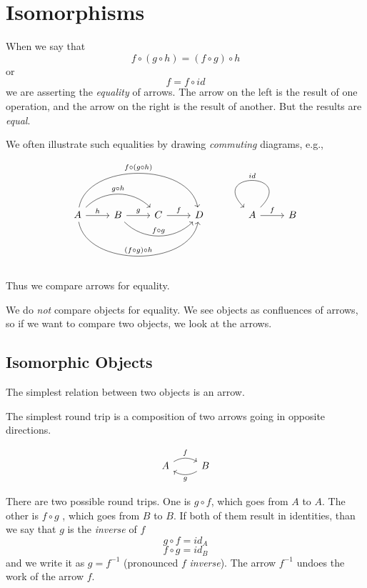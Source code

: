\documentclass[DaoFP]{subfiles}
\begin{document}
\setcounter{chapter}{2}


\chapter{Isomorphisms}

When we say that 
\[f \circ (g \circ h) = (f \circ g) \circ h \]
or
\[ f = f \circ id \]
we are asserting the \emph{equality} of arrows. The arrow on the left is the result of one operation, and the arrow on the right is the result of another. But the results are \emph{equal}.

We often illustrate such equalities by drawing \emph{commuting} diagrams, e.g.,

\[
 \begin{tikzcd}
 A
 \arrow[r, "h"]
 \arrow[rr, bend left=45, "g \circ h"]
 \arrow[rrr, bend left=80, "f \circ (g \circ h)"]
 \arrow[rrr, bend right=80, "(f \circ g) \circ h"]
 & B
 \arrow[r, "g"]
 \arrow[rr, bend right=45, "f \circ g"]
 &C
 \arrow[r, "f"]
 &D
 \end{tikzcd}
 \begin{tikzcd}
 A
 \arrow[r, "f"]
 \arrow[r, loop, "id"']
 &B
 \end{tikzcd}
\]

Thus we compare arrows for equality.

We do \emph{not} compare objects for equality. We see objects as confluences of arrows, so if we want to compare two objects, we look at the arrows.

\section{Isomorphic Objects}

The simplest relation between two objects is an arrow.

The simplest round trip is a composition of two arrows going in opposite directions. 

\[
 \begin{tikzcd}
 A
 \arrow[r, bend left, "f"]
 & B
 \arrow[l, bend left, "g"]
 \end{tikzcd}
\]

There are two possible round trips. One is $g \circ f$, which goes from $A$ to $A$. The other is $f \circ g$ , which goes from $B$ to $B$. If both of them result in identities, than we say that $g$ is the \emph{inverse} of $f$
\[ g \circ f = id_A\]
\[f \circ g = id_B\]
and we write it as $g = f^{-1}$ (pronounced $f$ \emph{inverse}). The arrow $ f^{-1}$ undoes the work of the arrow $f$. 
\end{document}
